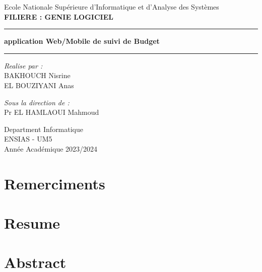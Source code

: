 \documentclass[12pt,twoside]{report}
\begin{document}
\begin{titlepage}
\begin{center}
  \vspace{0.2cm}
  {\huge Ecole Nationale Supérieure d'Informatique et d'Analyse des Systèmes}\\
  \vspace{0.5cm}
  \textbf{FILIERE : GENIE LOGICIEL}
  \vspace{0.5cm}
  \hrule
  \vspace{0.2cm}
  \textbf{\huge application Web/Mobile de suivi de Budget}
  \vspace{0.5cm}
  \hrule
  \vspace{1.5cm}
  \vfill
  \begin{minipage}[t]{0.45\textwidth}    %
    \raggedright\textit{Realise par :}\\

        BAKHOUCH Nisrine\\
        EL BOUZIYANI Anas
    \end{minipage}%
    \begin{minipage}[t]{0.45\textwidth}    %
      \raggedright\textit{Sous la direction de :}\\
        
        Pr EL HAMLAOUI Mahmoud
    \end{minipage}%
       \vspace{1.8cm}
       Department Informatique\\
       ENSIAS - UM5\\
       Année Académique 2023/2024
   \end{center}
\end{titlepage}
\shipout\null
{} %
\chapter*{Remerciments} %


\chapter*{Resume} %


\chapter*{Abstract} %

\end{document}
